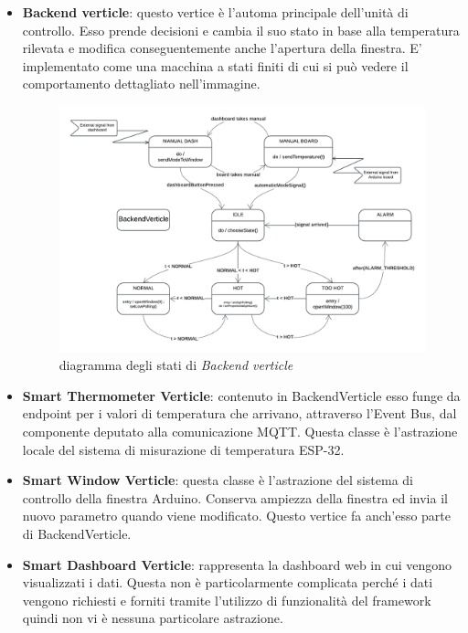 \documentclass{report}
\begin{document}
\begin{itemize}
    \item {
    \textbf{Backend verticle}: questo vertice è l'automa principale dell'unità di controllo. Esso prende decisioni e cambia il suo stato in base alla temperatura rilevata e modifica conseguentemente anche l'apertura della finestra. E' implementato come una macchina a stati finiti di cui si può vedere il comportamento dettagliato nell'immagine.
    \begin{figure}[H]
        \centering
        \includegraphics[width=\linewidth]{img/assignment-03/Backend Verticle.png}
        \caption{diagramma degli stati di \textit{Backend verticle}}
        \label{fig:main-task}
    \end{figure}
    }
    \item {
    \textbf{Smart Thermometer Verticle}: contenuto in BackendVerticle esso funge da endpoint per i valori di temperatura che arrivano, attraverso l'Event Bus, dal componente deputato alla comunicazione MQTT. Questa classe è l'astrazione locale del sistema di misurazione di temperatura ESP-32.
    }
    \item {
    \textbf{Smart Window Verticle}: questa classe è l'astrazione del sistema di controllo della finestra Arduino. Conserva ampiezza della finestra ed invia il nuovo parametro quando viene modificato. Questo vertice fa anch'esso parte di BackendVerticle.
    }
    \item {
    \textbf{Smart Dashboard Verticle}: rappresenta la dashboard web in cui vengono visualizzati i dati. Questa non è particolarmente complicata perché i dati vengono richiesti e forniti tramite l'utilizzo di funzionalità del framework quindi non vi è nessuna particolare astrazione. 
    }
\end{itemize}
\end{document}

